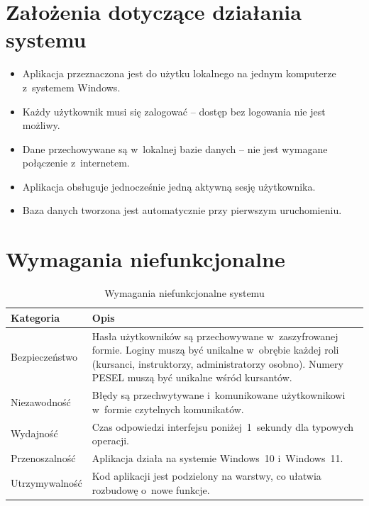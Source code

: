 \section{Za\l{}o\.{z}enia dotycz\k{a}ce dzia\l{}ania systemu}

\begin{itemize}
  \item Aplikacja przeznaczona jest do u\.{z}ytku lokalnego na jednym komputerze
        z~systemem Windows.
  \item Ka\.{z}dy u\.{z}ytkownik musi si\k{e} zalogowa\'{c} -- dost\k{e}p bez
        logowania nie jest mo\.{z}liwy.
  \item Dane przechowywane s\k{a} w~lokalnej bazie danych -- nie jest wymagane
        po\l{}\k{a}czenie z~internetem.
  \item Aplikacja obs\l{}uguje jednocze\'{s}nie jedn\k{a} aktywn\k{a} sesj\k{e}
        u\.{z}ytkownika.
  \item Baza danych tworzona jest automatycznie przy pierwszym uruchomieniu.
\end{itemize}

\section{Wymagania niefunkcjonalne}

\begin{table}[H]
\centering
\caption{Wymagania niefunkcjonalne systemu}
\label{tab:wymagania_nf}
\begin{tabularx}{\linewidth}{|l|X|}
\hline
\textbf{Kategoria} & \textbf{Opis} \\
\hline
Bezpiecze\'{n}stwo &
  Has\l{}a u\.{z}ytkownik\'{o}w s\k{a} przechowywane w~zaszyfrowanej formie.
  Loginy musz\k{a} by\'{c} unikalne w~obr\k{e}bie ka\.{z}dej roli (kursanci, instruktorzy, administratorzy osobno). Numery PESEL musz\k{a} by\'{c} unikalne w\'{s}r\'{o}d kursant\'{o}w. \\
\hline
Niezawodno\'{s}\'{c} &
  B\l{}\k{e}dy s\k{a} przechwytywane i~komunikowane u\.{z}ytkownikowi
  w~formie czytelnych komunikat\'{o}w. \\
\hline
Wydajno\'{s}\'{c} &
  Czas odpowiedzi interfejsu poni\.{z}ej~1~sekundy dla typowych operacji. \\
\hline
Przenoszalno\'{s}\'{c} &
  Aplikacja dzia\l{}a na systemie Windows~10 i~Windows~11. \\
\hline
Utrzymywalno\'{s}\'{c} &
  Kod aplikacji jest podzielony na warstwy, co u\l{}atwia rozbudow\k{e}
  o~nowe funkcje. \\
\hline
\end{tabularx}
\end{table}